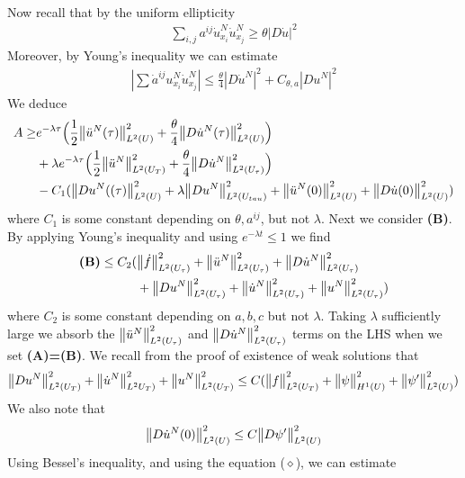 \documentclass[12pt,a4paper]{report}
\newenvironment{proof}
{\begin{changemargin}{1cm}{0.5cm} 
	}%
	{\end{changemargin}
}
\begin{document}
\begin{proof}
\begin{align*}
\end{align*}
Now recall that by the uniform ellipticity
\begin{align*}
\sum_{i,j}a^{ij}\dot{u}^N_{x_i} \dot{u}^N_{x_j} \geq \theta |D\dot{u}|^2
\end{align*}
Moreover, by Young's inequality we can estimate
\begin{align*}
|\sum \dot{a}^{ij}u^N_{x_i}\dot{u}^N_{x_j}|\leq \frac{\theta}{4} |D\dot{u}^N|^2 + C_{\theta, a}|Du^N|^2
\end{align*}
We deduce
\begin{align*}
A \geq & e^{-\lambda \tau} \Big(\frac{1}{2}\bigl\lVert\ddot{u}^N(\tau)\bigr\rVert_{L^2(U)}^2 + \frac{\theta}{4}\bigl\lVert D\dot{u}^N(\tau)\bigr\rVert_{L^2(U)}^2 \Big) \\
& + \lambda e^{-\lambda \tau}\Big(  \frac{1}{2}\bigl\lVert\ddot{u}^N\bigr\rVert_{L^2(U_T)}^2 + \frac{\theta}{4}\bigl\lVert D\dot{u}^N\bigr\rVert_{L^2(U_{\tau})}^2 \Big) \\
& - C_1 (\bigl\lVert Du^N((\tau)\bigr\rVert_{L^2(U)}^2 + \lambda \bigl\lVert Du^N\bigr\rVert_{L^2(U_{tau})}^2 + \bigl\lVert\ddot{u}^N(0)\bigr\rVert_{L^2(U)}^2 + \bigl\lVert D\dot{u}(0)\bigr\rVert_{L^2(U)}^2)
\end{align*}
where $C_1$ is some constant depending on $\theta, a^{ij}$, but not $\lambda$. Next we consider \textbf{(B)}. By applying Young's inequality and using $e^{-\lambda t} \leq 1$ we find
\begin{align*}
\textbf{(B)} \leq C_2 (&\bigl\lVert\dot{f}\bigr\rVert_{L^2(U_{\tau})}^2 + \bigl\lVert\ddot{u}^N\bigr\rVert_{L^2(U_{\tau})}^2 + \bigl\lVert D\dot{u}^N\bigr\rVert_{L^2(U_{\tau})}^2  \\
& + \bigl\lVert Du^N\bigr\rVert_{L^2(U_{\tau})}^2 + \bigl\lVert\dot{u}^N\bigr\rVert_{L^2(U_{\tau})}^2 + \bigl\lVert u^N\bigr\rVert_{L^2(U_{\tau})}^2 )
\end{align*}
where $C_2$ is some constant depending on $a,b,c$ but not $\lambda$. Taking $\lambda$ sufficiently large we absorb the $\bigl\lVert\ddot{u}^N\bigr\rVert_{L^2(U_{\tau})}^2$ and $\bigl\lVert D\dot{u}^N\bigr\rVert_{L^2(U_{\tau})}^2$ terms on the LHS when we set \textbf{(A)=(B)}. We recall from the proof of existence of weak solutions that
\begin{align*}
\bigl\lVert Du^N\bigr\rVert_{L^2(U_T)}^2 + \bigl\lVert\dot{u}^N\bigr\rVert_{L^2U_T)}^2 + \bigl\lVert u^N\bigr\rVert_{L^2(U_T)}^2 \leq C (\bigl\lVert f\bigr\rVert_{L^2(U_T)}^2 + \bigl\lVert\psi\bigr\rVert_{H^1(U)}^2 + \bigl\lVert\psi'\bigr\rVert_{L^2(U)}^2)
\end{align*}
We also note that
\begin{align*}
\bigl\lVert D\dot{u}^N(0)\bigr\rVert_{L^2(U)}^2 \leq C \bigl\lVert D\psi'\bigr\rVert_{L^2(U)}^2
\end{align*}
Using Bessel's inequality, and using the equation ($\diamond$), we can estimate
\begin{align*}

\end{align*}
\end{proof}
\end{document}
